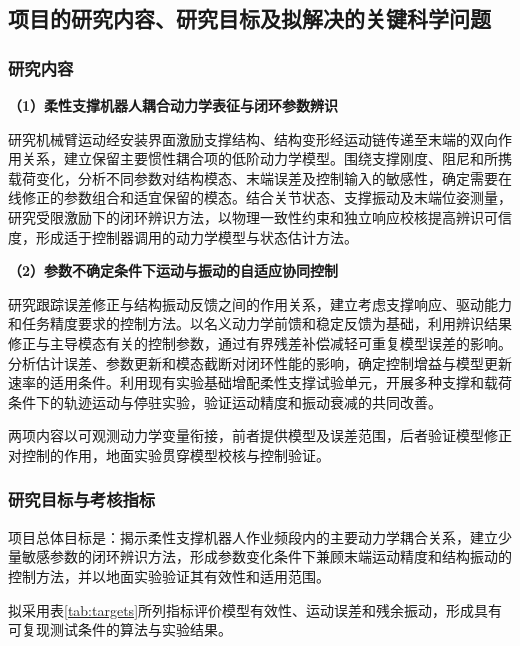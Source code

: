 \documentclass[UTF8,a4paper,zihao=-4,fontset=fandol]{ctexart}
\newcommand{\topic}[1]{\par\addvspace{0.5em}\noindent\textbf{#1}\par\nobreak}
\begin{document}
\endgroup

\subsection{项目的研究内容、研究目标及拟解决的关键科学问题}

\subsubsection{研究内容}

\topic{（1）柔性支撑机器人耦合动力学表征与闭环参数辨识}

研究机械臂运动经安装界面激励支撑结构、结构变形经运动链传递至末端的双向作用关系，建立保留主要惯性耦合项的低阶动力学模型。围绕支撑刚度、阻尼和所携载荷变化，分析不同参数对结构模态、末端误差及控制输入的敏感性，确定需要在线修正的参数组合和适宜保留的模态。结合关节状态、支撑振动及末端位姿测量，研究受限激励下的闭环辨识方法，以物理一致性约束和独立响应校核提高辨识可信度，形成适于控制器调用的动力学模型与状态估计方法。

\topic{（2）参数不确定条件下运动与振动的自适应协同控制}

研究跟踪误差修正与结构振动反馈之间的作用关系，建立考虑支撑响应、驱动能力和任务精度要求的控制方法。以名义动力学前馈和稳定反馈为基础，利用辨识结果修正与主导模态有关的控制参数，通过有界残差补偿减轻可重复模型误差的影响。分析估计误差、参数更新和模态截断对闭环性能的影响，确定控制增益与模型更新速率的适用条件。利用现有实验基础增配柔性支撑试验单元，开展多种支撑和载荷条件下的轨迹运动与停驻实验，验证运动精度和振动衰减的共同改善。

两项内容以可观测动力学变量衔接，前者提供模型及误差范围，后者验证模型修正对控制的作用，地面实验贯穿模型校核与控制验证。

\subsubsection{研究目标与考核指标}

项目总体目标是：揭示柔性支撑机器人作业频段内的主要动力学耦合关系，建立少量敏感参数的闭环辨识方法，形成参数变化条件下兼顾末端运动精度和结构振动的控制方法，并以地面实验验证其有效性和适用范围。

拟采用表\ref{tab:targets}所列指标评价模型有效性、运动误差和残余振动，形成具有可复现测试条件的算法与实验结果。
\end{document}
